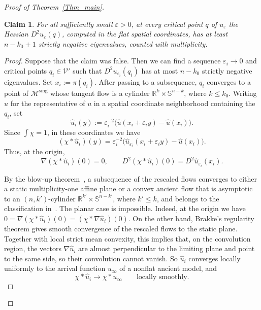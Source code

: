 \documentclass[12pt,twoside,reqno]{amsart}
\newcommand{\IR}{\mathbb{R}}
\newcommand{\IS}{\mathbb{S}}
\newcommand{\VV}{\mathcal{V}}
\newcommand{\MM}{\mathcal{M}}
\newcommand{\eps}{\varepsilon}
\DeclareMathOperator{\sing}{sing}
\newtheorem{Claim}[equation]{Claim}
\theoremstyle{definition}
\theoremstyle{remark}
\numberwithin{equation}{section}
\begin{document}
\begin{proof}[Proof of Theorem~\ref{Thm_main}]
\begin{Claim}\label{Cl_spectral}
For all sufficiently small $\eps>0$, at every critical point $q$ of $u_\eps$ the Hessian $D^2u_\eps(q)$, computed in the flat spatial coordinates, has at least $n-k_0+1$ strictly negative eigenvalues, counted with multiplicity.
\end{Claim}

\begin{proof}
Suppose that the claim was false.
Then we can find a sequence $\eps_i\to0$ and critical points $q_i\in\VV'$ such that $D^2u_{\eps_i}(q_i)$ has at most $n-k_0$ strictly negative eigenvalues.
Set $x_i:=\pi(q_i)$.
After passing to a subsequence, $q_i$ converges to a point of $\MM^{\sing}$ whose tangent flow is a cylinder $\IR^k\times\IS^{n-k}$, where $k\leq k_0$.
Writing $\hat u$ for the representative of $u$ in a spatial coordinate neighborhood containing the $q_i$, set
\[
 \hat u_i(y):=\eps_i^{-2}\big(\hat u(x_i+\eps_i y)-\hat u(x_i)\big).
\tag{3.3}\label{eq_rescale}
\]
Since $\int\chi=1$, in these coordinates we have
\[
 (\chi*\hat u_i)(y)=\eps_i^{-2}
 \big(\hat u_{\eps_i}(x_i+\eps_i y)-\hat u(x_i)\big).
\]
Thus, at the origin,
\[
 \nabla(\chi*\hat u_i)(0)=0,
 \qquad
 D^2(\chi*\hat u_i)(0)=D^2\hat u_{\eps_i}(x_i).
\tag{3.4}\label{eq_rescaled_critical}
\]

By the blow-up theorem~\cite[Theorem~1.12]{BamlerLai}, a subsequence of the rescaled flows converges to either a static multiplicity-one affine plane or a convex ancient flow that is asymptotic to an $(n,k')$-cylinder $\IR^{k'}\times\IS^{n-k'}$, where $k'\leq k$, and belongs to the classification in~\cite[Theorem~1.2]{BamlerLai}.
The planar case is impossible.
Indeed, at the origin we have $0=\nabla(\chi*\hat u_i)(0)=(\chi*\nabla\hat u_i)(0)$.
On the other hand, Brakke's regularity theorem gives smooth convergence of the rescaled flows to the static plane.
Together with local strict mean convexity, this implies that, on the convolution region, the vectors $\nabla\hat u_i$ are almost perpendicular to the limiting plane and point to the same side, so their convolution cannot vanish.
So $\hat u_i$ converges locally uniformly to the arrival function $u_\infty$ of a nonflat ancient model, and
\[
 \chi*\hat u_i\longrightarrow\chi*u_\infty
 \qquad\text{locally smoothly}.
\tag{3.5}\label{eq_smooth_conv}
\]


\end{proof}
\end{proof}
\end{document}
